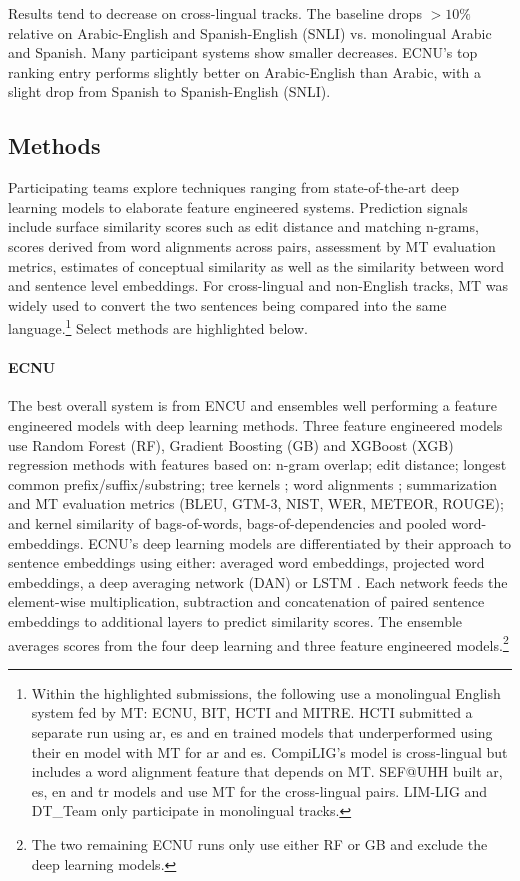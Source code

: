 \documentclass[11pt,a4paper]{article}
\begin{document}
Results tend to decrease on cross-lingual tracks. The baseline drops $>10\%$ relative on Arabic-English and Spanish-English (SNLI) vs. monolingual Arabic and Spanish. Many participant systems show smaller decreases. ECNU's top ranking entry performs slightly better on Arabic-English than Arabic, with a slight drop from Spanish to Spanish-English (SNLI).

\subsection{Methods}

Participating teams explore techniques ranging from state-of-the-art deep learning models to elaborate feature engineered systems. Prediction signals include surface similarity scores such as edit distance and matching n-grams, scores derived from word alignments across pairs, assessment by MT evaluation metrics, estimates of conceptual similarity as well as the similarity between word and sentence level embeddings. For cross-lingual and non-English tracks, MT was widely used to convert the two sentences being compared into the same language.\footnote{Within the highlighted submissions, the following use a monolingual English system fed by MT: ECNU, BIT, HCTI and MITRE. HCTI submitted a separate run using ar, es and en trained models that underperformed using their en model with MT for ar and es. CompiLIG's model is cross-lingual but includes a word alignment feature that depends on MT. SEF@UHH built ar, es, en and tr models and use MT for the cross-lingual pairs. LIM-LIG and DT\_Team only participate in monolingual tracks.} Select methods are highlighted below.

\paragraph{ECNU \textnormal{\cite{tian-EtAl:2017:SemEval}}} The best overall system is from ENCU and ensembles well performing a feature engineered models with deep learning methods. Three feature engineered models use Random Forest (RF), Gradient Boosting (GB) and XGBoost (XGB) regression methods with features based on: n-gram overlap; edit distance; longest common prefix/suffix/substring; tree kernels \cite{Moschitti:2006}; word alignments \cite{Sultan2015}; summarization and MT evaluation metrics (BLEU, GTM-3, NIST, WER, METEOR, ROUGE); and kernel similarity of bags-of-words, bags-of-dependencies and pooled word-embeddings. ECNU's deep learning models are differentiated by their approach to sentence embeddings using either: averaged word embeddings, projected word embeddings, a deep averaging network (DAN) \cite{iyyer-EtAl:2015:ACL-IJCNLP} or LSTM \cite{HochreiterSchmidhuber1997}. Each network feeds the element-wise multiplication, subtraction and concatenation of paired sentence embeddings to additional layers to predict similarity scores. The ensemble averages scores from the four deep learning and three feature engineered models.\footnote{The two remaining ECNU runs only use either RF or GB and exclude the deep learning models.}
\end{document}
